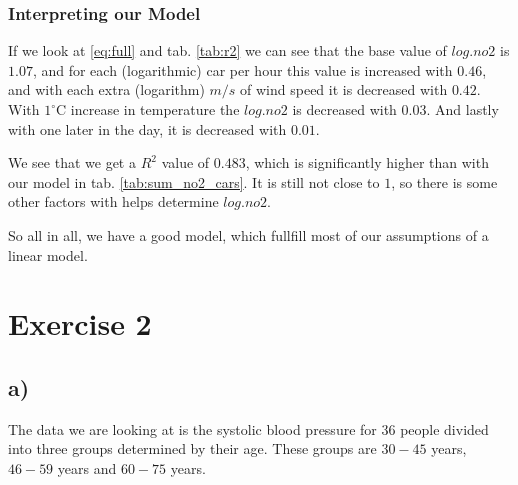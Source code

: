 \documentclass[a4paper,norsk, 10pt]{article}
\begin{document}
\subsubsection*{Interpreting our Model}
If we look at \eqref{eq:full} and tab. \ref{tab:r2} we can see that the base value of $log.no2$ is $1.07$, and for each (logarithmic) car per hour this value is increased with $0.46$, and with each extra (logarithm) $m/s$ of wind speed it is decreased with $0.42$. With $1^{\circ}$C increase in temperature the $log.no2$ is decreased with $0.03$. And lastly with one later in the day, it is decreased with $0.01$.

We see that we get a $R^2$ value of $0.483$, which is significantly higher than with our model in tab. \ref{tab:sum_no2_cars}. It is still not close to $1$, so there is some other factors with helps determine $log.no2$.

So all in all, we have a good model, which fullfill most of our assumptions of a linear model.





\section*{Exercise 2}

\subsection*{a)}

The data we are looking at is the systolic blood pressure for $36$ people divided into three groups determined by their age. These groups are $30-45$ years, $46-59$ years and $60-75$ years. 
\end{document}
